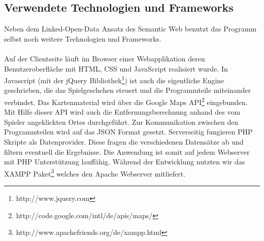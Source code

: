 \documentclass[a4paper, 11pt]{article}
\begin{document}
\subsection{Verwendete Technologien und Frameworks}
Neben dem Linked-Open-Data Ansatz des Semantic Web benutzt das Programm selbst noch weitere Technologien und Frameworks.\\\\
Auf der Clientseite läuft im Browser einer Webapplikation deren Benutzeroberfläche mit HTML, CSS und JavaScript realisiert wurde. In Javascript (mit der jQuery Bibliothek\footnote{http://www.jquery.com}) ist auch die eigentliche Engine geschrieben, die das Spielgeschehen steuert und die Programmteile miteinander verbindet. Das Kartenmaterial wird über die Google Maps API\footnote{http://code.google.com/intl/de/apis/maps/} eingebunden. Mit Hilfe dieser API wird auch die Entfernungsberechnung anhand des vom Spieler angeklickten Ortes durchgeführt. Zur Kommunikation zwischen den Programmteilen wird auf das JSON Format gesetzt. Serverseitig fungieren PHP Skripte als Datenprovider. Diese fragen die verschiedenen Datensätze ab und filtern eventuell die Ergebnisse. Die Anwendung ist somit auf jedem Webserver mit PHP Unterstützung lauffähig. Während der Entwicklung nutzten wir das XAMPP Paket\footnote{http://www.apachefriends.org/de/xampp.html} welches den Apache Webserver mitliefert.
\end{document}
